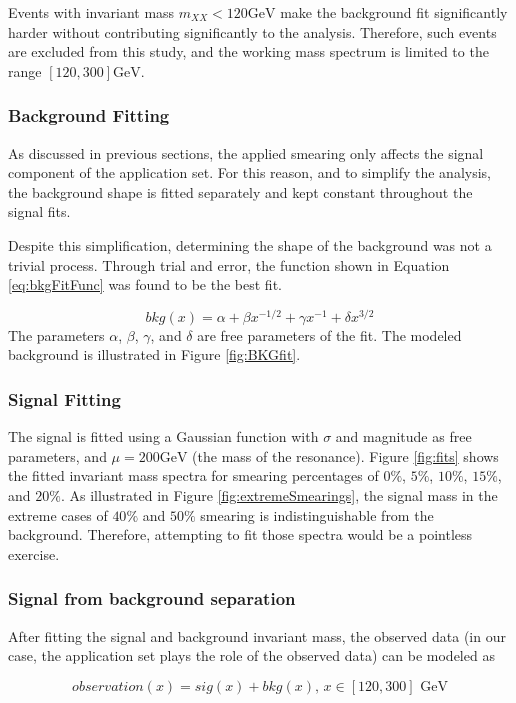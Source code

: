Events with invariant mass \(m_{XX} < 120\text{GeV}\) make the background fit significantly harder without contributing significantly to the analysis. Therefore, such events are excluded from this study, and the working mass spectrum is limited to the range \([120, 300]\text{GeV}\).
\subsubsection{Background Fitting}
\label{sec:org60ef007}
As discussed in previous sections, the applied smearing only affects the signal component of the application set. For this reason, and to simplify the analysis, the background shape is fitted separately and kept constant throughout the signal fits.

Despite this simplification, determining the shape of the background was not a trivial process. Through trial and error, the function shown in Equation \ref{eq:bkgFitFunc} was found to be the best fit.

\begin{equation}
bkg(x) = \alpha + \beta x^{-1/2} + \gamma x^{-1} + \delta x^{3/2}
\label{eq:bkgFitFunc}
\end{equation}
The parameters \(\alpha\), \(\beta\), \(\gamma\), and \(\delta\) are free parameters of the fit. The modeled background is illustrated in Figure \ref{fig:BKGfit}.
\subsubsection{Signal Fitting}
\label{sec:org74e8cd4}
The signal is fitted using a Gaussian function with \(\sigma\) and magnitude as free parameters, and \(\mu = 200\text{GeV}\) (the mass of the resonance). Figure \ref{fig:fits} shows the fitted invariant mass spectra for smearing percentages of \(0\%\), \(5\%\), \(10\%\), \(15\%\), and \(20\%\). As illustrated in Figure \ref{fig:extremeSmearings}, the signal mass in the extreme cases of \(40\%\) and \(50\%\) smearing is indistinguishable from the background. Therefore, attempting to fit those spectra would be a pointless exercise.
\subsubsection{Signal from background separation}
\label{sec:orgf26d5e2}
After fitting the signal and background invariant mass, the observed data (in our case, the application set plays the role of the observed data) can be modeled as

\begin{equation}
observation(x) = sig(x) + bkg(x)\text{, }x\in [120, 300] \text{ GeV}
\end{equation}

